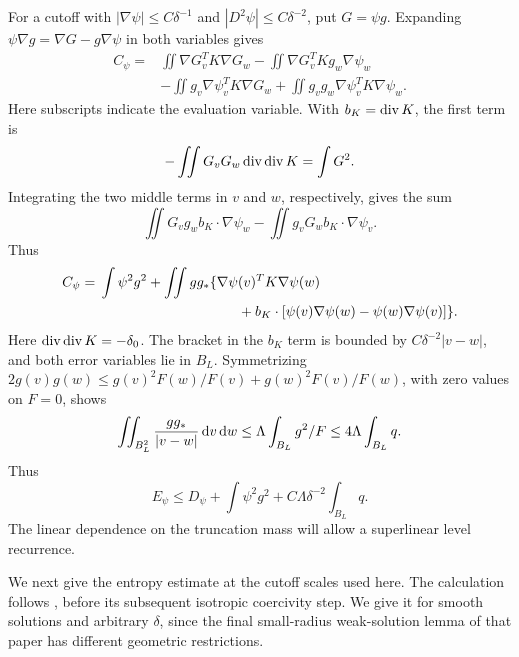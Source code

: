 For a cutoff with $|\nabla\psi|\le C\delta^{-1}$ and $|D^2\psi|\le C\delta^{-2}$, put $G=\psi g$. Expanding $\psi\nabla g=\nabla G-g\nabla\psi$ in both variables gives
\begin{align*}
 C_\psi={}&\iint\nabla G_v^TK\nabla G_w
 -\iint\nabla G_v^TKg_w\nabla\psi_w\\
 &-\iint g_v\nabla\psi_v^TK\nabla G_w
 +\iint g_vg_w\nabla\psi_v^TK\nabla\psi_w.
\end{align*}
Here subscripts indicate the evaluation variable. With $b_K=\operatorname{div} K$, the first term is
\[
 -\iint G_vG_w\operatorname{div}\operatorname{div} K=\int G^2.
\]
Integrating the two middle terms in $v$ and $w$, respectively, gives the sum
\[
 \iint G_vg_w b_K\cdot\nabla\psi_w
 -\iint g_vG_w b_K\cdot\nabla\psi_v.
\]
Thus
\begin{align}\label{eq:cross-exact}
 C_\psi={}&\int\psi^2g^2+\iint gg_*
 \{\nabla\psi(v)^TK\nabla\psi(w)\notag\\
 &\hspace{35mm}+b_K\cdot[\psi(v)\nabla\psi(w)-\psi(w)\nabla\psi(v)]\}.
\end{align}
Here $\operatorname{div}\operatorname{div} K=-\delta_0$. The bracket in the $b_K$ term is bounded by $C\delta^{-2}|v-w|$, and both error variables lie in $B_L$. Symmetrizing
$2g(v)g(w)\le g(v)^2F(w)/F(v)+g(w)^2F(v)/F(w)$, with zero values on $F=0$, shows
\[
 \iint_{B_L^2}\frac{gg_*}{|v-w|}\,\mathrm dv\,\mathrm dw
 \le\Lambda\int_{B_L}g^2/F\le4\Lambda\int_{B_L}q.
\]
Thus
\begin{equation}\label{eq:cross-bound}
 E_\psi\le D_\psi+\int\psi^2g^2+C\Lambda\delta^{-2}\int_{B_L}q.
\end{equation}
The linear dependence on the truncation mass will allow a superlinear level recurrence.

We next give the entropy estimate at the cutoff scales used here. The calculation follows \cite[(3.29)--(3.34)]{GIJV}, before its subsequent isotropic coercivity step. We give it for smooth solutions and arbitrary $\delta$, since the final small-radius weak-solution lemma of that paper has different geometric restrictions.

